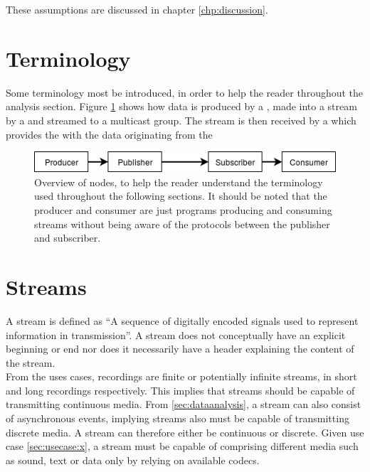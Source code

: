 These assumptions are discussed in chapter \ref{chp:discussion}. 

\section{Terminology} \label{sec:analysis:terminology}
Some terminology most be introduced, in order to help the reader throughout the analysis section. Figure \ref{fig:analysis:terminology} shows how data is produced by a , made into a stream by a  and streamed to a multicast group. The stream is then received by a  which provides the  with the data  originating from the 

\begin{figure}[h!]
	\includegraphics[width=1\textwidth]{figures/analysis-terminilogy-overview.png}
	\caption{Overview of nodes, to help the reader understand the terminology used throughout the following sections. It should be noted that the producer and consumer are just programs producing and consuming streams without being aware of the protocols between the publisher and subscriber.} \label{fig:analysis:terminology}
\end{figure}


\section{Streams} \label{sec:analysis:streams}
A stream is defined as ``A sequence of digitally encoded signals used to represent information in transmission''\citep{data_stream_2018}. A stream does not conceptually have an explicit beginning or end nor does it necessarily have a header explaining the content of the stream.\\
From the uses cases, recordings are finite or potentially infinite streams, in short and long recordings respectively. This implies that streams should be capable of transmitting   continuous media. From \ref{sec:dataanalysis}, a stream can also consist of asynchronous events, implying streams also must be capable of transmitting discrete media. 
A stream can therefore either be continuous or discrete. 
Given use case \ref{sec:usecase:x}, a stream must be capable of comprising  different media such as sound, text or data only by relying on available codecs. 

